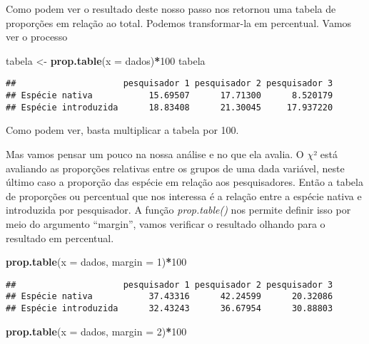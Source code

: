 \documentclass[titlepage, oneside, openany, a4paper]{book}
\newenvironment{Shaded}{\begin{snugshade}}{\end{snugshade}}
\newcommand{\DataTypeTok}[1]{\textcolor[rgb]{0.13,0.29,0.53}{#1}}
\newcommand{\DecValTok}[1]{\textcolor[rgb]{0.00,0.00,0.81}{#1}}
\newcommand{\KeywordTok}[1]{\textcolor[rgb]{0.13,0.29,0.53}{\textbf{#1}}}
\newcommand{\NormalTok}[1]{#1}
\newcommand{\OperatorTok}[1]{\textcolor[rgb]{0.81,0.36,0.00}{\textbf{#1}}}
\newcommand{\StringTok}[1]{\textcolor[rgb]{0.31,0.60,0.02}{#1}}
\begin{document}
Como podem ver o resultado deste nosso passo nos retornou uma tabela de proporções em relação ao total. Podemos transformar-la em percentual. Vamos ver o processo

\begin{Shaded}
\begin{Highlighting}[]
\NormalTok{tabela <-}\StringTok{ }\KeywordTok{prop.table}\NormalTok{(}\DataTypeTok{x =}\NormalTok{ dados)}\OperatorTok{*}\DecValTok{100}
\NormalTok{tabela}
\end{Highlighting}
\end{Shaded}

\begin{verbatim}
##                     pesquisador 1 pesquisador 2 pesquisador 3
## Espécie nativa           15.69507      17.71300      8.520179
## Espécie introduzida      18.83408      21.30045     17.937220
\end{verbatim}

Como podem ver, basta multiplicar a tabela por 100.

Mas vamos pensar um pouco na nossa análise e no que ela avalia. O \(\chi\)² está avaliando as proporções relativas entre os grupos de uma dada variável, neste último caso a proporção das espécie em relação aos pesquisadores. Então a tabela de proporções ou percentual que nos interessa é a relação entre a espécie nativa e introduzida por pesquisador. A função \emph{prop.table()} nos permite definir isso por meio do argumento ``margin'', vamos verificar o resultado olhando para o resultado em percentual.

\begin{Shaded}
\begin{Highlighting}[]
\KeywordTok{prop.table}\NormalTok{(}\DataTypeTok{x =}\NormalTok{ dados, }\DataTypeTok{margin =} \DecValTok{1}\NormalTok{)}\OperatorTok{*}\DecValTok{100}
\end{Highlighting}
\end{Shaded}

\begin{verbatim}
##                     pesquisador 1 pesquisador 2 pesquisador 3
## Espécie nativa           37.43316      42.24599      20.32086
## Espécie introduzida      32.43243      36.67954      30.88803
\end{verbatim}

\begin{Shaded}
\begin{Highlighting}[]
\KeywordTok{prop.table}\NormalTok{(}\DataTypeTok{x =}\NormalTok{ dados, }\DataTypeTok{margin =} \DecValTok{2}\NormalTok{)}\OperatorTok{*}\DecValTok{100}
\end{Highlighting}
\end{Shaded}
\end{document}
